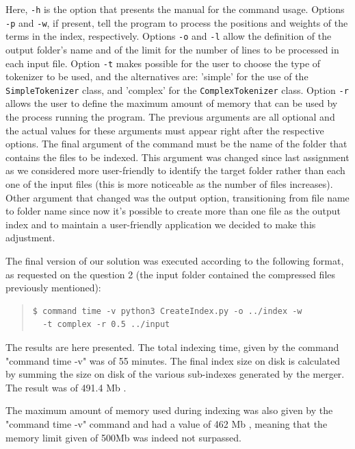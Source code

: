 \documentclass[12pt]{article}
\begin{document}
Here, \texttt{-h} is the option that presents the manual for the command usage.
Options \texttt{-p} and \texttt{-w}, if present, tell the program to process the
positions and weights of the terms in the index, respectively.
Options \texttt{-o} and \texttt{-l} allow the definition of the output folder's 
name and of the limit for the number of lines to be processed in each input file.
Option \texttt{-t} makes possible for the user to choose the type of tokenizer
to be used, and the alternatives are: 'simple' for the use of the 
\texttt{SimpleTokenizer} class, and 'complex' for the \texttt{ComplexTokenizer} class.
Option \texttt{-r} allows the user to define the maximum amount of memory that can
be used by the process running the program.
The previous arguments are all optional and the actual values for these arguments
must appear right after the respective options.
The final argument of the command must be the name of the folder that contains the
files to be indexed. This argument was changed since last assignment as we considered
more user-friendly to identify the target folder rather than each one of the input files
(this is more noticeable as the number of files increases). Other argument that changed
was the output option, transitioning from file name to folder name since now it's possible
to create more than one file as the output index and to maintain a user-friendly application we decided
to make this adjustment.

The final version of our solution was executed according to the following format,
as requested on the question 2 (the input folder contained the compressed
files previously mentioned):

\begingroup
\addtolength\leftmargini{-0.4in}
\addtolength\baselineskip{-0.05in}
\begin{quote}
\begin{verbatim}
$ command time -v python3 CreateIndex.py -o ../index -w 
  -t complex -r 0.5 ../input
\end{verbatim}
\end{quote}
\endgroup

The results are here presented. The total indexing time, given by the command
"command time -v" was of 55 minutes.
The final index size on disk is calculated by summing the size on disk of the 
various sub-indexes generated by the merger. 
The result was of 491.4 Mb .

The maximum amount of memory used during indexing was also given by the 
"command time -v" command and had a value of 462 Mb , meaning that
the memory limit given of 500Mb was indeed not surpassed.
\end{document}
